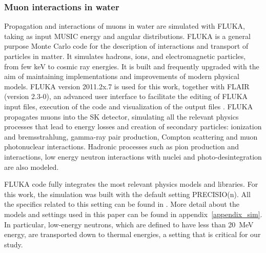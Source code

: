 \subsubsection{Muon interactions in water}
Propagation and interactions of muons in water are simulated with FLUKA, taking as input MUSIC energy and angular distributions. FLUKA \cite{fluka_manual, fluka_paper} is a general purpose Monte Carlo code for the description of interactions and transport of particles in matter. It simulates hadrons, ions, and electromagnetic particles, from few keV to cosmic ray energies. It is built and frequently upgraded with the aim of maintaining implementations and improvements of modern physical models. FLUKA version 2011.2x.7 is used for this work, together with FLAIR (version 2.3-0), an advanced user interface to facilitate the editing of FLUKA input files, execution of the code and visualization of the output files \cite{flair}. FLUKA propagates muons into the SK detector, simulating all the relevant physics processes that lead to energy losses and creation of secondary particles: ionization and bremsstrahlung, gamma-ray pair production, Compton scattering and muon photonuclear interactions.  Hadronic processes such as pion production and interactions, low energy neutron interactions with nuclei and photo-desintegration are also modeled.

FLUKA code fully integrates the most relevant physics models and libraries. For this work, the simulation was built with the default setting PRECISIO(n). All the specifics related to this setting can be found in \cite{fluka_manual}.  More detail about the models and settings used in this paper can be found in appendix~\ref{appendix_sim}. In particular, low-energy neutrons, which are defined to have less than 20~MeV energy, are transported down to thermal energies, a setting that is critical for our study. 

